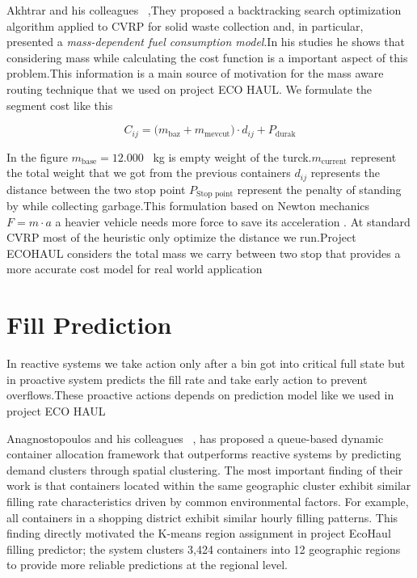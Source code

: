 \documentclass[12pt,a4paper]{report}
\begin{document}
\indent Akhtrar and his colleagues ~\cite{akhtar2017},They proposed a backtracking search optimization algorithm applied to CVRP for solid waste collection and, in particular, presented a
\textit{mass-dependent fuel consumption model}.In his studies he shows that considering mass while calculating the cost function is a important aspect of this problem.This information is a main source of motivation for the mass aware routing technique that we used on project ECO HAUL. We formulate the segment cost like this

\begin{equation}
  C_{ij} = \bigl(m_{\text{baz}} + m_{\text{mevcut}}\bigr) \cdot d_{ij} + P_{\text{durak}}
  \label{eq:mass_aware}
\end{equation}

\indent In the figure $m_{\text{base}} = 12{.}000$~ kg is empty weight of the turck.$m_{\text{current}}$ represent the total weight that we got from the previous containers $d_{ij}$ represents the distance between the two stop point $P_{\text{Stop point}}$ represent the penalty of standing by while collecting garbage.This formulation based on Newton mechanics  $F = m \cdot a$ a heavier vehicle needs more force to save its acceleration . At standard CVRP  most of the heuristic only optimize the distance we run.Project ECOHAUL considers the total mass we carry between two stop that provides a more accurate cost model for real world application


\section{Fill Prediction}
\indent In reactive systems we take action only after a bin got into critical full state but in proactive system predicts the fill rate and take early action to prevent overflows.These proactive actions depends on prediction model like we used in project ECO HAUL

\indent Anagnostopoulos and his colleagues ~\cite{anagnostopoulos2015}, has proposed a queue-based dynamic container allocation framework that outperforms reactive systems by predicting demand clusters through spatial clustering. The most important finding of their work is that containers located within the same geographic cluster exhibit similar filling rate characteristics driven by common environmental factors. For example, all containers in a shopping district exhibit similar hourly filling patterns. This finding directly motivated the K-means region assignment in project EcoHaul  filling predictor; the system clusters 3,424 containers into 12 geographic regions to provide more reliable predictions at the regional level.
\end{document}
